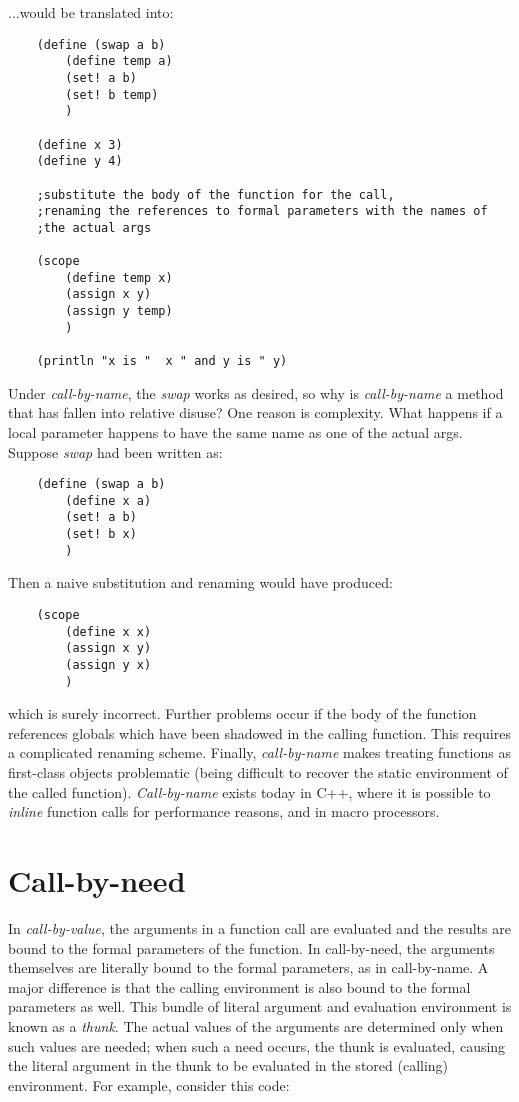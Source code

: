...would be translated into:

\begin{verbatim}
    (define (swap a b)
        (define temp a)
        (set! a b)
        (set! b temp)
        )

    (define x 3)
    (define y 4)

    ;substitute the body of the function for the call, 
    ;renaming the references to formal parameters with the names of 
    ;the actual args

    (scope
        (define temp x)
        (assign x y)
        (assign y temp)
        )

    (println "x is "  x " and y is " y)
\end{verbatim}

Under {\it call-by-name}, the {\it swap} works as desired,
so why is {\it call-by-name}
a method that has fallen into relative disuse? One reason is complexity.
What happens if a local parameter happens to have the same name as one of
the actual args. Suppose {\it swap} had been written as:

\begin{verbatim}
    (define (swap a b)
        (define x a) 
        (set! a b)
        (set! b x)
        )
\end{verbatim}

Then a naive substitution and renaming would have produced:

\begin{verbatim}
    (scope
        (define x x)
        (assign x y)
        (assign y x)
        )
\end{verbatim}

which is surely incorrect.
Further problems occur if the body of the function references
globals which have been shadowed in the calling function. This requires
a complicated renaming scheme. Finally, {\it call-by-name} makes treating
functions as first-class objects problematic (being difficult to recover
the static environment of the called function). {\it Call-by-name}
exists today in C++, where it is possible to {\it inline} function calls
for performance reasons, and in macro processors.

\section*{Call-by-need}

In {\it call-by-value}, the arguments in a function call are evaluated and
the results are bound to the formal parameters of the function. In
call-by-need, the arguments themselves are literally bound
to the formal
parameters, as in call-by-name. A major difference is
that the calling environment is also bound to the formal
parameters as well. This bundle of literal argument and 
evaluation environment is known as a {\it thunk}.
The actual values of the arguments
are determined only when such values are
needed; when such a need occurs, the thunk is
evaluated, causing the literal argument
in the thunk to be
evaluated in the stored (calling) environment.
For example, consider this code:


